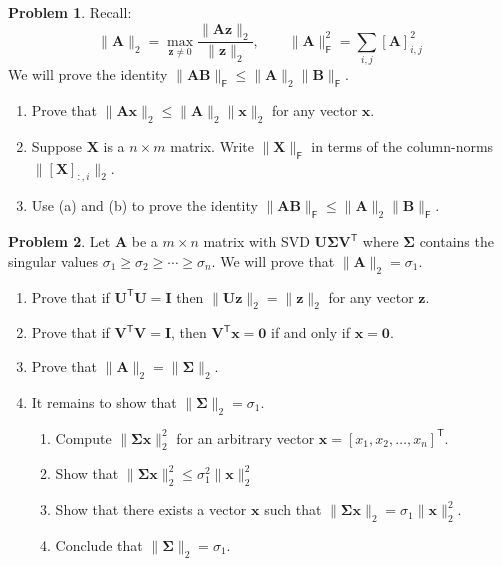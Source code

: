 \documentclass[12pt]{article}
\theoremstyle{definition}
\newtheorem{problem}{Problem}
\renewcommand{\vec}{\mathbf}
\newcommand{\T}{\mathsf{T}}
\newcommand{\F}{\mathsf{F}}
\begin{document}
\hfill

\begin{problem}
Recall:
\[
\| \vec{A} \|_2 = \max_{\vec{z} \neq 0} \frac{\| \vec{A}\vec{z} \|_2}{\| \vec{z} \|_2}
,\qquad
\| \vec{A} \|_\F^2 = \sum_{i,j} [\vec{A}]_{i,j}^2 
\]
We will prove the identity $\|\vec{A}\vec{B}\|_\F \leq \|\vec{A}\|_2 \| \vec{B} \|_\F$.
\begin{enumerate}
    \item 
        Prove that $\| \vec{A}\vec{x} \|_2 \leq \|\vec{A}\|_2 \|\vec{x}\|_2$ for any vector $\vec{x}$.
    \item 
        Suppose $\vec{X}$ is a $n\times m$ matrix. 
        Write $\|\vec{X}\|_\F$ in terms of the column-norms $\|[\vec{X}]_{:,i}\|_2$.
    \item Use (a) and (b) to prove the identity $\|\vec{A}\vec{B}\|_\F \leq \|\vec{A}\|_2 \| \vec{B} \|_\F$.
\end{enumerate}

\end{problem}

\clearpage
\begin{problem}
    Let $\vec{A}$ be a $m\times n$ matrix with SVD $\vec{U}\vec{\Sigma}\vec{V}^\T$ where $\vec{\Sigma}$ contains the singular values $\sigma_1 \geq \sigma_2 \geq \cdots \geq \sigma_n$.
    We will prove that $\|\vec{A}\|_2 = \sigma_1$.
    \begin{enumerate}
        \item Prove that if $\vec{U}^\T\vec{U} = \vec{I}$ then $\|\vec{U}\vec{z}\|_2 = \|\vec{z}\|_2$ for any vector $\vec{z}$.
        \item Prove that if $\vec{V}^\T\vec{V} = \vec{I}$, then $\vec{V}^\T \vec{x} = \vec{0}$ if and only if $\vec{x} = \vec{0}$.
        \item Prove that $\|\vec{A}\|_2 = \|\vec{\Sigma}\|_2$.
        \item It remains to show that $\|\vec{\Sigma}\|_2 = \sigma_1$.
        \begin{enumerate}[label=(\roman*)]
            \item  Compute $\|\vec{\Sigma}\vec{x}\|_2^2$ for an arbitrary vector $\vec{x} = [x_1, x_2, \ldots, x_n]^\T$.
            \item Show that $\|\vec{\Sigma}\vec{x}\|_2^2 \leq \sigma_1^2 \| \vec{x}\|_2^2$
            \item Show that there exists a vector $\vec{x}$ such that $\|\vec{\Sigma}\vec{x}\|_2 = \sigma_1 \| \vec{x}\|_2^2$.
            \item Conclude that $\|\vec{\Sigma}\|_2 = \sigma_1$.
        \end{enumerate}

    \end{enumerate}
\end{problem}
\end{document}
